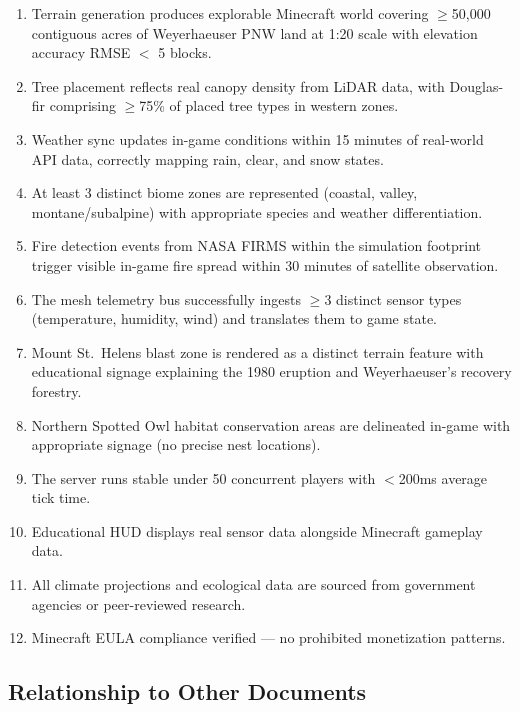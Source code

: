 \documentclass[11pt,letterpaper]{article}
\begin{document}
\begin{enumerate}[label=\textbf{\arabic*.}]
  \item Terrain generation produces explorable Minecraft world covering $\geq$50,000 contiguous acres of Weyerhaeuser PNW land at 1:20 scale with elevation accuracy RMSE $<$ 5 blocks.
  \item Tree placement reflects real canopy density from LiDAR data, with Douglas-fir comprising $\geq$75\% of placed tree types in western zones.
  \item Weather sync updates in-game conditions within 15 minutes of real-world API data, correctly mapping rain, clear, and snow states.
  \item At least 3 distinct biome zones are represented (coastal, valley, montane/subalpine) with appropriate species and weather differentiation.
  \item Fire detection events from NASA FIRMS within the simulation footprint trigger visible in-game fire spread within 30 minutes of satellite observation.
  \item The mesh telemetry bus successfully ingests $\geq$3 distinct sensor types (temperature, humidity, wind) and translates them to game state.
  \item Mount St.\ Helens blast zone is rendered as a distinct terrain feature with educational signage explaining the 1980 eruption and Weyerhaeuser's recovery forestry.
  \item Northern Spotted Owl habitat conservation areas are delineated in-game with appropriate signage (no precise nest locations).
  \item The server runs stable under 50 concurrent players with $<$200ms average tick time.
  \item Educational HUD displays real sensor data alongside Minecraft gameplay data.
  \item All climate projections and ecological data are sourced from government agencies or peer-reviewed research.
  \item Minecraft EULA compliance verified --- no prohibited monetization patterns.
\end{enumerate}

\subsection{Relationship to Other Documents}
\end{document}
